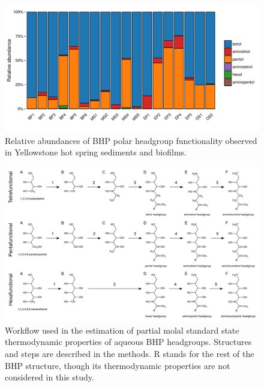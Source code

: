 \singlespace
\begin{figure}[h]
\centering
\includegraphics[width=1\linewidth]{figs_ch3/BHP_barchart.pdf}
\caption[Relative abundances of BHP polar headgroup functionality observed in Yellowstone hot spring sediments and biofilms]{Relative abundances of BHP polar headgroup functionality observed in Yellowstone hot spring sediments and biofilms.}
\label{fig:BHP_abund_Bison}
\end{figure}
\doublespace



\singlespace
\begin{figure}[h]
\centering
\includegraphics[width=1\linewidth]{figs_ch3/BHP_thermoest_paper.pdf}
\caption[Workflow used in the estimation of partial molal standard state thermodynamic properties of aqueous BHP headgroups]{Workflow used in the estimation of partial molal standard state thermodynamic properties of aqueous BHP headgroups. Structures and steps are described in the methods. R stands for the rest of the BHP structure, though its thermodynamic properties are not considered in this study.}
\label{fig:BHP_thermoest_paper}
\end{figure}
\doublespace


